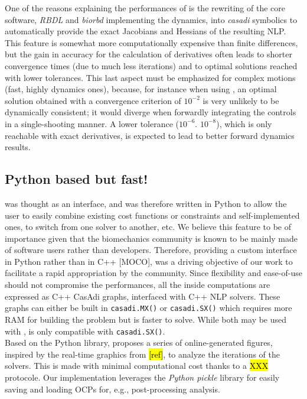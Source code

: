 One of the reasons explaining the performances of \bioptim is the rewriting of the core software, \textit{RBDL} and \textit{biorbd} implementing the dynamics, into \textit{casadi} symbolics to automatically provide the exact Jacobians and Hessians of the resulting NLP.  
This feature is somewhat more computationally expensive than finite differences, but the gain in accuracy for the calculation of derivatives often leads to shorter convergence times (due to much less iterations) and to optimal solutions reached with lower tolerances.
This last aspect must be emphasized for complex motions (fast, highly dynamics ones), because, for instance when using \ipopt, an optimal solution obtained with a convergence criterion of $10^{-2}$ is very unlikely to be dynamically consistent; 
it would diverge when forwardly integrating the controls in a single-shooting manner. 
A lower tolerance ($10^{-6}$. $10^{-8}$), which is only reachable with exact derivatives, is expected to lead to better forward dynamics results.

\subsection{Python based but fast!}

\bioptim was thought as an interface, and was therefore written in Python to allow the user to easily combine existing cost functions or constraints and self-implemented ones, to switch from one solver to another, etc. 
We believe this feature to be of importance given that the biomechanics community is known to be mainly made of software users rather than developers.
Therefore, providing a custom interface in Python rather than in C++ [MOCO], was a driving objective of our work to facilitate a rapid appropriation by the community.
Since flexibility and ease-of-use should not compromise the performances, all the inside computations are expressed as C++ CasAdi graphs, interfaced with C++ NLP solvers.
These graphs can either be built in \texttt{casadi.MX()} or \texttt{casadi.SX()} which requires more RAM for building the problem but is faster to solve.
While both may be used with \ipopt, \acados is only compatible with \texttt{casadi.SX()}.\\
Based on the \bioviz Python library, \bioptim proposes a series of online-generated figures, inspired by the  real-time graphics from \muscodii \hl{[ref]}, to analyze the iterations of the solvers.
This is made with minimal computational cost thanks to a \hl{XXX} protocole. 
Our implementation leverages the \textit{Python pickle} library for easily saving and loading OCPs for, e.g., post-processing analysis.

